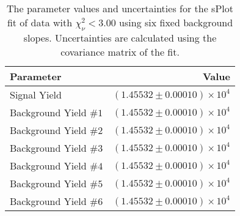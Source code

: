 
\begin{table}[ht]
    \begin{center}
        \begin{tabular}{lr}\toprule
            Parameter & Value \\\midrule
            Signal Yield & $(1.45532 \pm 0.00010) \times 10^{4}$ \\
            Background Yield $\#1$ & $(1.45532 \pm 0.00010) \times 10^{4}$ \\
            Background Yield $\#2$ & $(1.45532 \pm 0.00010) \times 10^{4}$ \\
            Background Yield $\#3$ & $(1.45532 \pm 0.00010) \times 10^{4}$ \\
            Background Yield $\#4$ & $(1.45532 \pm 0.00010) \times 10^{4}$ \\
            Background Yield $\#5$ & $(1.45532 \pm 0.00010) \times 10^{4}$ \\
            Background Yield $\#6$ & $(1.45532 \pm 0.00010) \times 10^{4}$ \\\bottomrule
        \end{tabular}
        \caption{The parameter values and uncertainties for the sPlot fit of data with $\chi^2_\nu < 3.00$ using six fixed background slopes. Uncertainties are calculated using the covariance matrix of the fit.}\label{tab:splot-fit-results-chisqdof-3.00-fixed-6}
    \end{center}
\end{table}
